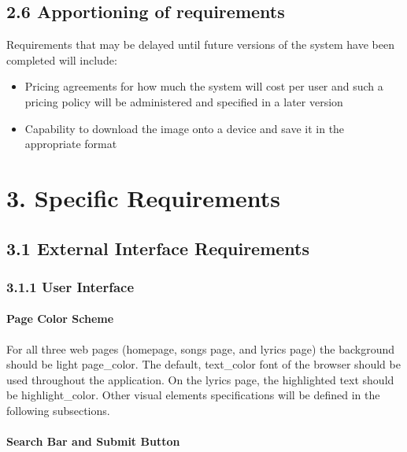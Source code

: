 \documentclass[]{article}
\begin{document}
\subsection{2.6 Apportioning of
requirements}\label{apportioning-of-requirements}

Requirements that may be delayed until future versions of the system
have been completed will include:

\begin{itemize}
\itemsep1pt\parskip0pt
\item
  Pricing agreements for how much the system will cost per user and such
  a pricing policy will be administered and specified in a later version
\item
  Capability to download the image onto a device and save it in the
  appropriate format
\end{itemize}

\section{3. Specific Requirements}\label{specific-requirements}

\subsection{3.1 External Interface
Requirements}\label{external-interface-requirements}

\subsubsection{3.1.1 User Interface}\label{user-interface}

\paragraph{Page Color Scheme}\label{page-color-scheme}

For all three web pages (homepage, songs page, and lyrics page) the
background should be light page\_color. The default, text\_color font of
the browser should be used throughout the application. On the lyrics
page, the highlighted text should be highlight\_color. Other visual
elements specifications will be defined in the following subsections.

\paragraph{Search Bar and Submit
Button}\label{search-bar-and-submit-button}
\end{document}
